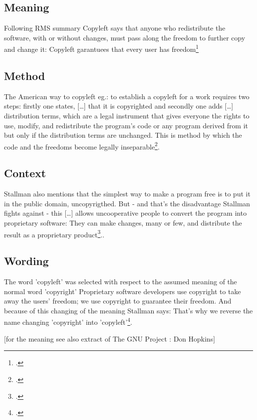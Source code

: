 \documentclass[DIV=calc,BCOR=5mm,11pt,headings=small,oneside,abstract=true, toc=bib]{scrartcl}
\begin{document}
\subsection{Meaning}

Following RMS summary \glqq{}Copyleft says that anyone who redistribute the
software, with or without changes, must pass along the freedom to further copy
and change it\grqq{}: \glqq{}Copyleft garantuees that every user has
freedom\grqq{}\footcite[cf][89]{Stallman1996c}

\subsection{Method}

The American way to \glqq{}copyleft\grqq{} eg.: to establish a copyleft for a
work requires two steps: firstly one states, \glqq{}[\ldots] that it is
copyrighted\grqq{} and secondly one adds \glqq{}[\ldots] distribution
terms, which are a legal instrument that gives everyone the rights to use,
modify, and redistribute the program's code or any program derived from it
but only if the distribution terms are unchanged\grqq{}. This is method by which 
\glqq{}the code and the freedoms become legally
inseparable\grqq{}\footcite[cf][89]{Stallman1996c}.

\subsection{Context}
Stallman also mentions that \glqq{}the simplest way to make a program
free is to put it in the public domain, uncopyrigthed\grqq{}. But - and that's
the disadvantage Stallman fights against - this \glqq{}[\ldots] allows
uncooperative people to convert the program into proprietary software\grqq{}:
\glqq{}They can make changes, many or few, and distribute the result as a
proprietary product\grqq{}\footcite[cf][89]{Stallman1996c}..


\subsection{Wording}

The word 'copyleft' was selected with respect to the assumed meaning of
the normal word 'copyright' \glqq{}Proprietary software developers use
copyright to take away the users' freedom; we use copyright to guarantee
their freedom\grqq{}. And because of this changing of the meaning Stallman says:
\glqq{}That's why we reverse the name changing 'copyright' into
'copyleft'\grqq{}\footcite[cf][89]{Stallman1996c}.

[for the meaning see also extract of The GNU Project : Don Hopkins]

\small

\end{document}
